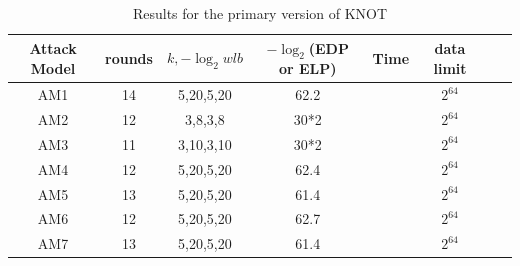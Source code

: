 \begin{table}
	\caption{Results for the primary version of KNOT}\label{tab:knot}
	\centering
	\begin{tabular}{|c|c|c|c|c|c|c|c|}
		\hline
		Attack Model & rounds & $k,-\log_2wlb$ & $-\log_2$(EDP or ELP) & Time & data limit\\
		\hline
		AM1 & 14 & 5,20,5,20 & 62.2 & & $2^{64}$ \\
		AM2 & 12 & 3,8,3,8 & 30*2 & & $2^{64}$ \\
		AM3 & 11 & 3,10,3,10 & 30*2 & & $2^{64}$ \\
		AM4 & 12 & 5,20,5,20 & 62.4 & & $2^{64}$ \\
		AM5 & 13 & 5,20,5,20 & 61.4 & & $2^{64}$ \\
		AM6 & 12 & 5,20,5,20 & 62.7 & & $2^{64}$ \\
		AM7 & 13 & 5,20,5,20 & 61.4 & & $2^{64}$ \\
		\hline
	\end{tabular}
\end{table}
